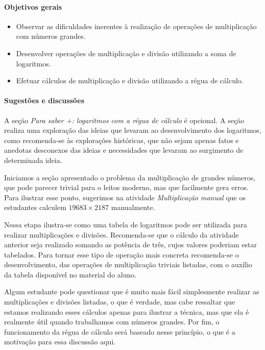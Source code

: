 \clearpage
\begin{texto}
{
\paragraph{Objetivos gerais}
\begin{itemize}
\item Observar as dificuldades inerentes à realização de operações de multiplicação com números grandes.
\item Desenvolver operações de multiplicação e divisão utilizando a soma de logaritmos.
\item Efetuar cálculos de multiplicação e divisão utilizando a régua de cálculo.
\end{itemize}

\vspace{-\parskip}
\paragraph{Sugestões e discussões}
	
A seção \textit{Para saber +: logaritmos com a régua de cálculo} é opcional. A seção realiza uma exploração das ideias que levaram ao desenvolvimento dos logaritmos, como recomenda-se às explorações históricas, que não sejam apenas fatos e anedotas desconexos das ideias e necessidades que levaram ao surgimento de determinada ideia.

Iniciamos a seção apresentado o problema da multiplicação de grandes números, que pode parecer trivial para o leitos moderno, mas que facilmente gera erros. Para ilustrar esse ponto, sugerimos na atividade \textit{Multiplicação manual} que os estudantes calculem $19683 \times 2187$ manualmente.

Nessa etapa ilustra-se como uma tabela de logaritmos pode ser utilizada para realizar multiplicações e divisões. Recomenda-se que o cálculo da atividade anterior seja realizado somando as potência de três, cujos valores poderiam estar tabelados. Para tornar esse tipo de operação mais concreta recomenda-se o desenvolvimento, das operações de multiplicação triviais listadas, com o auxílio da tabela disponível no material do aluno.

Algum estudante pode questionar que é muito mais fácil simplesmente realizar as multiplicações e divisões listadas, o que é verdade, mas cabe ressaltar que estamos realizando esses cálculos apenas para ilustrar a técnica, mas que ela é realmente útil quando trabalhamos com números grandes. Por fim, o funcionamento da régua de cálculo será baseado nesse princípio, o que é a motivação para essa discussão aqui.
}
\end{texto}
